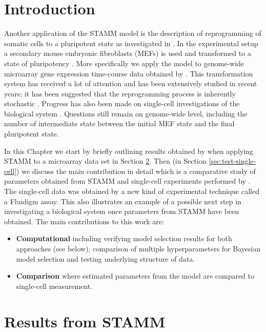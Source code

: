 
\section{Introduction}
\label{sec:introduction-rep}

Another application of the STAMM model is the description of reprogramming of somatic cells to a pluripotent state as investigated in \cite{Armond:2013}. In the experimental setup a secondary mouse embryonic fibroblasts (MEFs) is used and transformed to a state of pluripotency \citep{Takahashi:2006hi,Jaenisch:2008cz}. More specifically we apply the model to genome-wide microarray gene expression time-course data obtained by \cite{SamavarchiTehrani:2010cp}. This transformation system has received a lot of attention and has been extensively studied in recent years; it has been suggested that the reprogramming process is inherently stochastic \citep{Hanna:2009ix}. Progress has also been made on single-cell investigations of the biological system \citep{Buganim:2012hp}. Questions still remain on genome-wide level, including the number of intermediate state between the initial MEF state and the final pluripotent state.

In this Chapter we start by briefly outlining results obtained by \cite{Armond:2013} when applying STAMM to a microarray data set in Section \ref{sec:iPsc-results}. Then (in Section \ref{sec:test-single-cell}) we discuss the main contribution in detail which is a comparative study of parameters obtained from STAMM and single-cell experiments performed by \cite{Buganim:2012hp}. The single-cell data was obtained by a new kind of experimental technique called a Fluidigm assay. This also illustrates an example of a possible next step in investigating a biological system once parameters from STAMM have been obtained. The main contributions to this work are:

\begin{itemize}
\item {\bf Computational} including verifying model selection results for both approaches (see below), comparison of multiple hyperparameters for Bayesian model selection and testing underlying structure of data.
\item {\bf Comparison} where estimated parameters from the model are compared to single-cell measurement.
\end{itemize}

\section{Results from STAMM}
\label{sec:iPsc-results}

